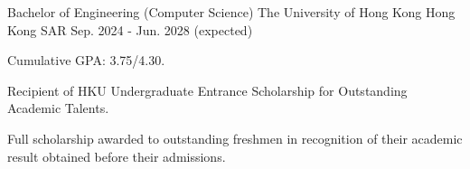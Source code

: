 

\begin{cventries}

  \cventry
    {Bachelor of Engineering (Computer Science)} %
    {The University of Hong Kong} %
    {Hong Kong SAR} %
    {Sep. 2024 - Jun. 2028 (expected)} %
    {
      \begin{cvitems} %
        \item {Cumulative GPA: 3.75/4.30.}
        \item {Recipient of HKU Undergraduate Entrance Scholarship for Outstanding Academic Talents.}
        \item {Full scholarship awarded to outstanding freshmen in recognition of their academic result obtained before their
admissions.}
      \end{cvitems}
    }

\end{cventries}
